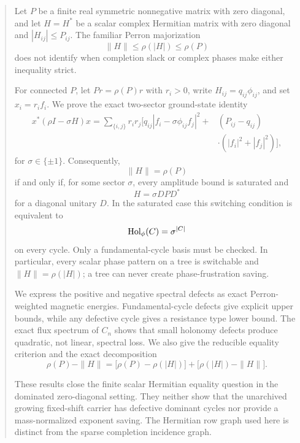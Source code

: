 \begin{abstract}
Let \(P\) be a finite real symmetric nonnegative matrix with zero
diagonal, and let \(H=H^*\) be a scalar complex Hermitian matrix with
zero diagonal and \(|H_{ij}|\le P_{ij}\).  The familiar Perron
majorization
\[
 \|H\|\le\rho(|H|)\le\rho(P)
\]
does not identify when completion slack or complex phases make either
inequality strict.

For connected \(P\), let \(Pr=\rho(P)r\) with \(r_i>0\), write
\(H_{ij}=q_{ij}\phi_{ij}\), and set \(x_i=r_if_i\).  We prove the exact
two-sector ground-state identity
\[
\begin{split}
x^*(\rho I-\sigma H)x
=
\sum_{\{i,j\}}r_ir_j\bigl[
q_{ij}|f_i-\sigma\phi_{ij}f_j|^2
{}+{}&(P_{ij}-q_{ij})\\
&\cdot(|f_i|^2+|f_j|^2)
\bigr],
\end{split}
\]
for \(\sigma\in\{\pm1\}\).  Consequently,
\[
\|H\|=\rho(P)
\]
if and only if, for some sector \(\sigma\), every amplitude bound is
saturated and
\[
 H=\sigma DPD^*
\]
for a diagonal unitary \(D\).  In the saturated case this switching
condition is equivalent to
\[
 \Hol_\phi(C)=\sigma^{|C|}
\]
on every cycle.  Only a fundamental-cycle basis must be checked.  In
particular, every scalar phase pattern on a tree is switchable and
\(\|H\|=\rho(|H|)\); a tree can never create phase-frustration saving.

We express the positive and negative spectral defects as exact
Perron-weighted magnetic energies.  Fundamental-cycle defects give
explicit upper bounds, while any defective cycle gives a resistance
type lower bound.  The exact flux spectrum of \(C_n\) shows that small
holonomy defects produce quadratic, not linear, spectral loss.  We also
give the reducible equality criterion and the exact decomposition
\[
\rho(P)-\|H\|
=
\bigl[\rho(P)-\rho(|H|)\bigr]
+\bigl[\rho(|H|)-\|H\|\bigr].
\]

These results close the finite scalar Hermitian equality question in
the dominated zero-diagonal setting.
They neither show that the unarchived growing fixed-shift carrier has
defective dominant cycles nor provide a mass-normalized exponent
saving.  The Hermitian row graph used here is distinct from the sparse
completion incidence graph.
\end{abstract}
